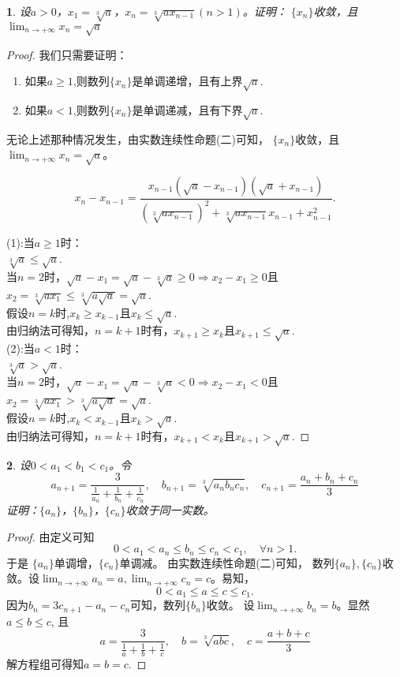 \documentclass[utf8]{book}
\newtheorem{example}{}[section]             %
\begin{document}
\begin{example}
设$a> 0$，$x_1 =  \sqrt[3]{a}$，$x_n=\sqrt[3]{ax_{n-1}}(n> 1)$。证明： $\{x_n\}$收敛，且$\displaystyle  \lim_{n\to +\infty}x_n=\sqrt{a}$
\end{example}
\begin{proof}
我们只需要证明：
\renewcommand\labelenumi{\normalfont(\theenumi)}
\begin{enumerate}
\item 如果$a\geq 1$,则数列$\{x_n\}$是单调递增，且有上界$\sqrt{a}$.
\item 如果$a<1$,则数列$\{x_n\}$是单调递减，且有下界$\sqrt{a}$.
\end{enumerate}
无论上述那种情况发生，由实数连续性命题(二)可知， $\{x_n\}$收敛，且$\displaystyle  \lim_{n\to +\infty}x_n=\sqrt{a}$。

$$x_n - x_{n-1} = \displaystyle\frac{x_{n-1}(\sqrt{a}-x_{n-1})(\sqrt{a}+x_{n-1})}{\left(\sqrt[3]{ax_{n-1}}\right)^2 + \sqrt[3]{ax_{n-1}}x_{n-1}+x_{n-1}^2}.$$

\noindent(1):当$a\geq1$时：\\
$\sqrt[3]{a} \leq \sqrt{a}$.\\
当$n=2$时，$\sqrt{a}-x_1 = \sqrt{a}-\sqrt[3]{a} \geq 0 \Rightarrow x_2-x_1 \geq  0$且$x_2 = \sqrt[3]{ax_1} \leq \sqrt[3]{a \sqrt{a}} = \sqrt{a}$.\\
假设$n=k$时,$x_k \geq x_{k-1}$且$x_k \leq \sqrt{a}$.\\
由归纳法可得知，$n=k+1$时有，$x_{k+1} \geq x_k$且$x_{k+1}\leq \sqrt{a}$.\\

\noindent(2):当$a<1$时：\\
$\sqrt[3]{a} > \sqrt{a}$.\\
当$n=2$时，$\sqrt{a}-x_1 = \sqrt{a}-\sqrt[3]{a} < 0 \Rightarrow x_2-x_1 < 0$且$x_2 = \sqrt[3]{ax_1} > \sqrt[3]{a \sqrt{a}} = \sqrt{a}$.\\
假设$n=k$时,$x_k < x_{k-1}$且$x_k > \sqrt{a}$.\\
由归纳法可得知，$n=k+1$时有，$x_{k+1} < x_k$且$x_{k+1} > \sqrt{a}$.
\end{proof}
\begin{example}
设$0<a_1<b_1<c_1$。令
$$a_{n+1}=\frac{3}{\frac{1}{a_n}+\frac{1}{b_n}+\frac{1}{c_n}},\quad
b_{n+1} =  \sqrt[3]{a_nb_nc_n},\quad
c_{n+1}= \frac{a_n+b_n+c_n}{3}
$$
证明：$\{a_n\}$，$\{b_n\}$，$\{c_n\}$收敛于同一实数。
\end{example}
\begin{proof}
由定义可知$$0< a_1< a_n \leq b_n \leq c_n < c_1, \quad\forall n >1.$$
于是 $\{a_n\}$单调增，$\{c_n\}$单调减。
由实数连续性命题(二)可知， 数列$\{a_n\}, \{c_n\}$收敛。设$\displaystyle  \lim_{n\to +\infty}a_n=a, \displaystyle  \lim_{n\to +\infty}c_n=c$。易知，$$0<a_1 \leq a\leq c\leq c_1.$$
因为$b_n = 3c_{n+1} - a_n - c_n$可知，数列$\{b_n\}$收敛。
设$\displaystyle \lim_{n\to +\infty}b_n=b$。显然$a\leq b\leq c$, 且
\begin{equation*}
a = \frac{3}{\displaystyle\frac{1}{a}+\frac{1}{b}+\frac{1}{c}},\quad
b = \displaystyle\sqrt[3]{abc},\quad
c = \displaystyle\frac{a+b+c}{3}
\end{equation*}
解方程组可得知$a=b=c$.
\end{proof}
\end{document}

